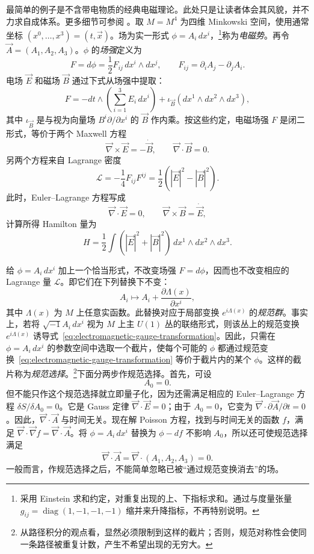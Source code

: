 最简单的例子是不含带电物质的经典电磁理论。此处只是让读者体会其风貌，并不力求自成体系。更多细节可参阅 。取 $M=M^4$ 为四维 Minkowski 空间，使用通常坐标 $(x^0,\ldots,x^3)=(t,\vec x)$。场为实一形式 $\phi=A_i\,dx^i$，\footnote{采用 Einstein 求和约定，对重复出现的上、下指标求和。通过与度量张量 $g_{ij}=\operatorname{diag}(1,-1,-1,-1)$ 缩并来升降指标，不再特别说明。}称为\emph{电磁势}。再令 $\vec A=(A_1,A_2,A_3)$。$\phi$ 的\emph{场强}定义为
\[
F=d\phi=\frac12F_{ij}\,dx^i\wedge dx^j,\qquad
F_{ij}=\partial_iA_j-\partial_jA_i.
\]
电场 $\vec E$ 和磁场 $\vec B$ 通过下式从场强中提取：
\[
F=-dt\wedge\left(\sum_{i=1}^3E_i\,dx^i\right)
+\iota_{\vec B}(dx^1\wedge dx^2\wedge dx^3),
\]
其中 $\iota_{\vec B}$ 是与视为向量场 $B^i\partial/\partial x^i$ 的 $\vec B$ 作内乘。按这些约定，电磁场强 $F$ 是闭二形式，等价于两个 Maxwell 方程
\[
\vec\nabla\times\vec E=-\dot{\vec B},\qquad
\vec\nabla\cdot\vec B=0.
\]
另两个方程来自 Lagrange 密度
\begin{equation}\label{eq:electromagnetic-lagrangian-density}
\mathcal L=-\frac14F_{ij}F^{ij}
=\frac12(|\vec E|^2-|\vec B|^2).
\end{equation}
此时，Euler--Lagrange 方程写成
\[
\vec\nabla\cdot\vec E=0,\qquad
\vec\nabla\times\vec B=\dot{\vec E},
\]
计算所得 Hamilton 量为
\[
H=\frac12\int(|\vec E|^2+|\vec B|^2)\,dx^1\wedge dx^2\wedge dx^3.
\]

给 $\phi=A_i\,dx^i$ 加上一个恰当形式，不改变场强 $F=d\phi$，因而也不改变相应的 Lagrange 量 $\mathcal L$。即它们在下列替换下不变：
\begin{equation}\label{eq:electromagnetic-gauge-transformation}
A_i\longmapsto A_i+\frac{\partial\Lambda(x)}{\partial x^i},
\end{equation}
其中 $\Lambda(x)$ 为 $M$ 上任意实函数。此替换对应于局部变换 $e^{i\Lambda(x)}$ 的\emph{规范群}。事实上，若将 $\sqrt{-1}A_i\,dx^i$ 视为 $M$ 上主 $U(1)$ 丛的联络形式，则该丛上的规范变换 $e^{i\Lambda(x)}$ 诱导式~\eqref{eq:electromagnetic-gauge-transformation}。因此，只需在 $\phi=A_i\,dx^i$ 的参数空间中选取一个截片，使每个可能的 $\phi$ 都通过规范变换~\eqref{eq:electromagnetic-gauge-transformation} 等价于截片内的某个 $\phi$。这样的截片称为\emph{规范选择}。\footnote{从路径积分的观点看，显然必须限制到这样的截片；否则，规范对称性会使同一条路径被重复计数，产生不希望出现的无穷大。}下面分两步作规范选择。首先，可设
\begin{equation}\label{eq:temporal-electromagnetic-gauge}
A_0=0.
\end{equation}
但不能只作这个规范选择就立即量子化，因为还需满足相应的 Euler--Lagrange 方程 $\delta S/\delta A_0=0$。它是 Gauss 定律 $\vec\nabla\cdot\vec E=0$；由于 $A_0=0$，它变为 $\vec\nabla\cdot\partial\vec A/\partial t=0$。因此，$\vec\nabla\cdot\vec A$ 与时间无关。现在解 Poisson 方程，找到与时间无关的函数 $f$，满足 $\vec\nabla\cdot\vec\nabla f=\vec\nabla\cdot\vec A$。将 $\phi=A_i\,dx^i$ 替换为 $\phi-df$ 不影响 $A_0$，所以还可使规范选择满足
\begin{equation}\label{eq:transverse-electromagnetic-gauge}
\vec\nabla\cdot\vec A=\vec\nabla\cdot(A_1,A_2,A_3)=0.
\end{equation}
一般而言，作规范选择之后，不能简单忽略已被“通过规范变换消去”的场。

